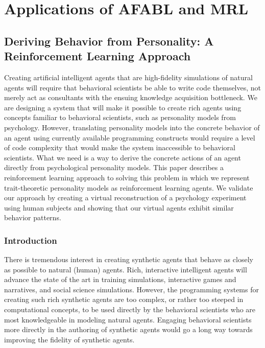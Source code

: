 \chapter{Applications of AFABL and MRL}\label{ch:applications}

\section{Deriving Behavior from Personality: A Reinforcement Learning Approach}

Creating artificial intelligent agents that are high-fidelity simulations of natural agents will require that behavioral scientists be able to write code themselves, not merely act as consultants with the ensuing knowledge acquisition bottleneck.  We are designing a system that will make it possible to create rich agents using concepts familiar to behavioral scientists, such as personality models from psychology.  However, translating personality models into the concrete behavior of an agent using currently available programming constructs would require a level of code complexity that would make the system inaccessible to behavioral scientists.  What we need is a way to derive the concrete actions of an agent directly from psychological personality models.  This paper describes a reinforcement learning approach to solving this problem in which we represent trait-theoretic personality models as reinforcement learning agents.  We validate our approach by creating a virtual reconstruction of a psychology experiment using human subjects and showing that our virtual agents exhibit similar behavior patterns.


\subsection{Introduction}

There is tremendous interest in creating synthetic agents that behave as closely as possible to natural (human) agents.  Rich, interactive intelligent agents will advance the state of the art in training simulations, interactive games and narratives, and social science simulations.  However, the programming systems for creating such rich synthetic agents are too complex, or rather too steeped in computational concepts, to be used directly by the behavioral scientists who are most knowledgeable in modeling natural agents. Engaging behavioral scientists more directly in the authoring of synthetic agents would go a long way towards improving the fidelity of synthetic agents.

